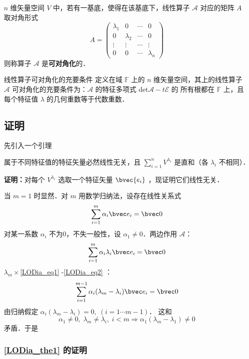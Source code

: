 \begin{definition}{}
 $n$ 维矢量空间 $V$ 中，若有一基底，使得在该基底下，线性算子 $\mathcal{A}$ 对应的矩阵 $A$ 取对角形式
 \begin{equation}
 A=\begin{pmatrix}
 \lambda_1&0&\cdots&0\\
 0&\lambda_2&\cdots&0\\
 \vdots&\vdots&\cdots&\vdots\\
 0&0&\cdots&\lambda_n
 \end{pmatrix}
 \end{equation}
 则称算子 $\mathcal{A}$ 是\textbf{可对角化}的．
\end{definition}
\begin{theorem}{线性算子可对角化的充要条件}\label{LODia_the1}
定义在域 $\mathbb{F}$ 上的 $n$ 维矢量空间，其上的线性算子 $\mathcal{A}$ 可对角化的充要条件为：$\mathcal{A}$ 的特征多项式 $\mathrm{det}{\mathcal{A}-t \mathcal{E}}$ 的 所有根都在 $\mathbb{F}$ 上，且每个特征值 $\lambda$ 的几何重数等于代数重数．
\end{theorem}
\subsection{证明}
先引入一个引理
\begin{lemma}{}
属于不同特征值的特征矢量必然线性无关，且 $\sum\limits_{i=1}^nV^{\lambda_i}$ 是直和（各 $\lambda_i$ 不相同）．
\end{lemma}
\textbf{证明：}对每个 $V^{\lambda_i}$ 选取一个特征矢量 $\bvec{e_i}$ ，现证明它们线性无关．

当 $m=1$ 时显然．对 $m$ 用数学归纳法，设存在线性关系式
\begin{equation}\label{LODia_eq1}
\sum_{i=1}^{m}\alpha_i\bvec e_i=\bvec 0
\end{equation}
对某一系数 $\alpha_i$ 不为0，不失一般性，设 $\alpha_1\neq0$．两边作用 $\mathcal A$：
\begin{equation}\label{LODia_eq2}
\sum_{i=1}^m\alpha_i\lambda_i\bvec e_i=\bvec 0
\end{equation}
$\lambda_m\times$\autoref{LODia_eq1} -\autoref{LODia_eq2} ：
\begin{equation}
\sum_{i=1}^{m-1}\alpha_i(\lambda_m-\lambda_i)\bvec e_i=\bvec 0
\end{equation}
由归纳假定 $\alpha_i(\lambda_m-\lambda_i)=0,\;(i=1\cdots m-1)$． 这和
\begin{equation}
\alpha_1\ne0,\;\lambda_m\neq\lambda_i,\;i<m\Rightarrow \alpha_1(\lambda
_m-\lambda_1)\neq0
\end{equation}
矛盾．于是

\subsubsection{\autoref{LODia_the1} 的证明}